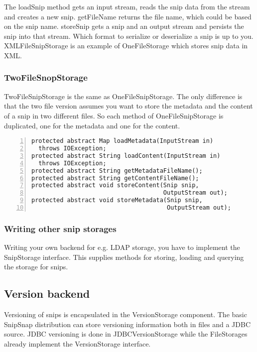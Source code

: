 \documentclass[a4paper,pdftex]{article}
\begin{document}
The loadSnip method gets an input stream, reads the snip data from the stream
and creates a new snip. getFileName returns the file name, which could be based
on the snip name. storeSnip gets a snip and an output stream and persists the
snip into that stream. Which format to serialize or deserialize a snip is up to you.
XMLFileSnipStorage is an example of OneFileStorage which stores snip data 
in XML.
 
\subsubsection{TwoFileSnopStorage}

TwoFileSnipStorage is the same as OneFileSnipStorage. The only difference
is that the two file version assumes you want to store the metadata and the
content of a snip in two different files. So each method of OneFileSnipStorage
is duplicated, one for the metadata and one for the content.

\begin{Verbatim}[gobble=0,frame=single,numbers=left,fontsize=\small]
protected abstract Map loadMetadata(InputStream in) 
  throws IOException;
protected abstract String loadContent(InputStream in)
  throws IOException;
protected abstract String getMetadataFileName();
protected abstract String getContentFileName();
protected abstract void storeContent(Snip snip, 
                                     OutputStream out);
protected abstract void storeMetadata(Snip snip, 
                                      OutputStream out);
\end{Verbatim}

\subsubsection{Writing other snip storages}

Writing your own backend for e.g. LDAP storage, you have
to implement the SnipStorage interface. This supplies methods
for storing, loading and querying the storage for snips.

\subsection{Version backend}

Versioning of snips is encapsulated in the VersionStorage component.
The basic SnipSnap distribution can store versioning information
both in files and a JDBC source. JDBC versioning is done in JDBCVersionStorage
while the FileStorages already implement the VersionStorage interface.
\end{document}
